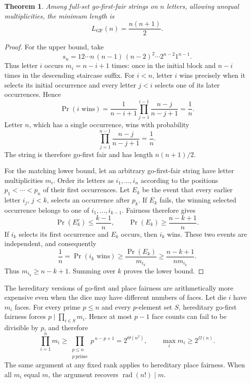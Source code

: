 \documentclass[11pt]{article}
\newtheorem{theorem}{Theorem}[section]
\theoremstyle{definition}
\theoremstyle{remark}
\begin{document}
\begin{theorem}\label{thm:go-first-optimum}
Among full-set go-first-fair strings on \(n\) letters, allowing unequal
multiplicities, the minimum length is
\[
  L_{\mathrm{GF}}(n)=\frac{n(n+1)}2.
\]
\end{theorem}

\begin{proof}
For the upper bound, take
\begin{equation}\label{eq:go-first-staircase}
  s_n=12\cdots n\,(n-1)\,(n-2)^2\cdots 2^{n-2}1^{n-1}.
\end{equation}
Thus letter \(i\) occurs \(m_i=n-i+1\) times: once in the initial block and
\(n-i\) times in the descending staircase suffix.  For \(i<n\), letter \(i\)
wins precisely when it selects its initial occurrence and every letter
\(j<i\) selects one of its later occurrences.  Hence
\[
  \Pr(i\text{ wins})
  =\frac1{n-i+1}\prod_{j=1}^{i-1}\frac{n-j}{n-j+1}
  =\frac1n.
\]
Letter \(n\), which has a single occurrence, wins with probability
\[
  \prod_{j=1}^{n-1}\frac{n-j}{n-j+1}=\frac1n.
\]
The string is therefore go-first fair and has length \(n(n+1)/2\).

For the matching lower bound, let an arbitrary go-first-fair string have
letter multiplicities \(m_i\).  Order its letters as
\(i_1,\ldots,i_n\) according to the positions
\(p_1<\cdots<p_n\) of their first occurrences.  Let \(E_k\) be the event
that every earlier letter \(i_j\), \(j<k\), selects an occurrence after
\(p_k\).  If \(E_k\) fails, the winning selected occurrence belongs to one
of \(i_1,\ldots,i_{k-1}\).  Fairness therefore gives
\[
  \Pr(E_k^c)\leq\frac{k-1}{n},
  \qquad
  \Pr(E_k)\geq\frac{n-k+1}{n}.
\]
If \(i_k\) selects its first occurrence and \(E_k\) occurs, then \(i_k\)
wins.  These two events are independent, and consequently
\[
  \frac1n=\Pr(i_k\text{ wins})
  \geq\frac{\Pr(E_k)}{m_{i_k}}
  \geq\frac{n-k+1}{n m_{i_k}}.
\]
Thus \(m_{i_k}\geq n-k+1\).  Summing over \(k\) proves the lower bound.
\end{proof}

The hereditary versions of go-first and place fairness are arithmetically
more expensive even when the dice may have different numbers of faces.  Let
die \(i\) have \(m_i\) faces.  For every prime \(p\leq n\) and every
\(p\)-element set \(S\), hereditary go-first fairness forces
\(p\mid\prod_{i\in S}m_i\).  Hence at most \(p-1\) face counts can fail to
be divisible by \(p\), and therefore
\begin{equation}\label{eq:hereditary-primorial}
  \prod_{i=1}^n m_i
  \geq\prod_{\substack{p\leq n\\p\ \mathrm{prime}}}p^{\,n-p+1}
  =2^{\Theta(n^2)},
  \qquad \max_i m_i\geq2^{\Omega(n)}.
\end{equation}
The same argument at any fixed rank applies to hereditary place fairness.
When all \(m_i\) equal \(m\), the argument recovers
\(\operatorname{rad}(n!)\mid m\).
\end{document}
